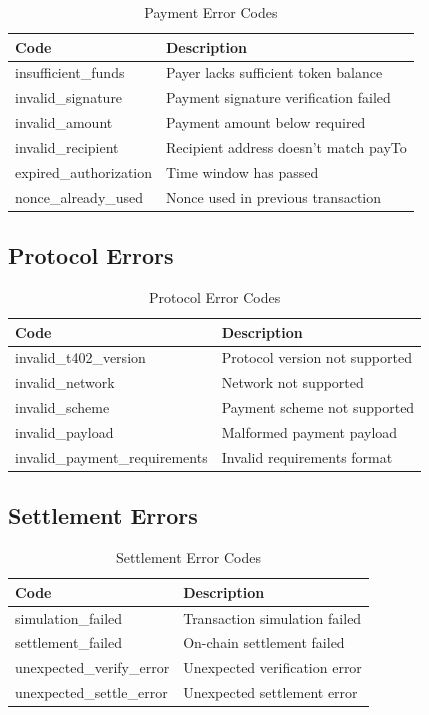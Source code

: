 \begin{table}[htbp]
\centering
\caption{Payment Error Codes}
\label{tab:payment-errors-spec}
\footnotesize
\begin{tabular}{>{\ttfamily}l p{6cm}}
\toprule
\normalfont\textbf{Code} & \textbf{Description} \\
\midrule
insufficient\_funds & Payer lacks sufficient token balance \\
invalid\_signature & Payment signature verification failed \\
invalid\_amount & Payment amount below required \\
invalid\_recipient & Recipient address doesn't match payTo \\
expired\_authorization & Time window has passed \\
nonce\_already\_used & Nonce used in previous transaction \\
\bottomrule
\end{tabular}
\end{table}

\subsection{Protocol Errors}

\begin{table}[htbp]
\centering
\caption{Protocol Error Codes}
\label{tab:protocol-errors-spec}
\footnotesize
\begin{tabular}{>{\ttfamily}l p{6cm}}
\toprule
\normalfont\textbf{Code} & \textbf{Description} \\
\midrule
invalid\_t402\_version & Protocol version not supported \\
invalid\_network & Network not supported \\
invalid\_scheme & Payment scheme not supported \\
invalid\_payload & Malformed payment payload \\
invalid\_payment\_requirements & Invalid requirements format \\
\bottomrule
\end{tabular}
\end{table}

\subsection{Settlement Errors}

\begin{table}[htbp]
\centering
\caption{Settlement Error Codes}
\label{tab:settlement-errors-spec}
\footnotesize
\begin{tabular}{>{\ttfamily}l p{6cm}}
\toprule
\normalfont\textbf{Code} & \textbf{Description} \\
\midrule
simulation\_failed & Transaction simulation failed \\
settlement\_failed & On-chain settlement failed \\
unexpected\_verify\_error & Unexpected verification error \\
unexpected\_settle\_error & Unexpected settlement error \\
\bottomrule
\end{tabular}
\end{table}


